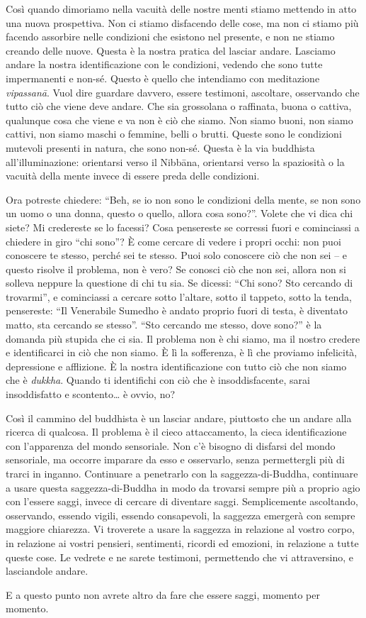 Così quando dimoriamo nella vacuità delle nostre menti stiamo mettendo
in atto una nuova prospettiva. Non ci stiamo disfacendo delle cose, ma
non ci stiamo più facendo assorbire nelle condizioni che esistono nel
presente, e non ne stiamo creando delle nuove. Questa è la nostra
pratica del lasciar andare. Lasciamo andare la nostra identificazione
con le condizioni, vedendo che sono tutte impermanenti e non-sé. Questo
è quello che intendiamo con meditazione \emph{vipassanā}. Vuol dire
guardare davvero, essere testimoni, ascoltare, osservando che tutto ciò che viene deve andare. Che sia grossolana o raffinata, buona o cattiva,
qualunque cosa che viene e va non è ciò che siamo. Non siamo buoni, non
siamo cattivi, non siamo maschi o femmine, belli o brutti. Queste sono
le condizioni mutevoli presenti in natura, che sono non-sé. Questa è la
via buddhista all'illuminazione: orientarsi verso il Nibbāna, orientarsi
verso la spaziosità o la vacuità della mente invece di essere preda
delle condizioni.

Ora potreste chiedere: ``Beh, se io non sono le condizioni della mente,
se non sono un uomo o una donna, questo o quello, allora cosa sono?''.
Volete che vi dica chi siete? Mi credereste se lo facessi? Cosa
pensereste se corressi fuori e cominciassi a chiedere in giro ``chi
sono''? È come cercare di vedere i propri occhi: non puoi conoscere te
stesso, perché sei te stesso. Puoi solo conoscere ciò che non sei -- e
questo risolve il problema, non è vero? Se conosci ciò che non sei,
allora non si solleva neppure la questione di chi tu sia. Se dicessi:
``Chi sono? Sto cercando di trovarmi'', e cominciassi a cercare sotto
l'altare, sotto il tappeto, sotto la tenda, pensereste: ``Il Venerabile
Sumedho è andato proprio fuori di testa, è diventato matto, sta cercando
se stesso''. ``Sto cercando me stesso, dove sono?'' è la domanda più
stupida che ci sia. Il problema non è chi siamo, ma il nostro credere e
identificarci in ciò che non siamo. È lì la sofferenza, è lì che
proviamo infelicità, depressione e afflizione. È la nostra
identificazione con tutto ciò che non siamo che è \emph{dukkha}. Quando
ti identifichi con ciò che è insoddisfacente, sarai insoddisfatto e
scontento\ldots{} è ovvio, no?

Così il cammino del buddhista è un lasciar andare, piuttosto che un
andare alla ricerca di qualcosa. Il problema è il cieco attaccamento, la
cieca identificazione con l'apparenza del mondo sensoriale. Non c'è
bisogno di disfarsi del mondo sensoriale, ma occorre imparare da esso e
osservarlo, senza permettergli più di trarci in inganno. Continuare a
penetrarlo con la saggezza-di-Buddha, continuare a usare questa
saggezza-di-Buddha in modo da trovarsi sempre più a proprio agio con
l'essere saggi, invece di cercare di diventare saggi. Semplicemente
ascoltando, osservando, essendo vigili, essendo consapevoli, la saggezza
emergerà con sempre maggiore chiarezza. Vi troverete a usare la saggezza
in relazione al vostro corpo, in relazione ai vostri pensieri, sentimenti, ricordi ed
emozioni, in relazione a tutte queste cose. Le vedrete e ne sarete
testimoni, permettendo che vi attraversino, e lasciandole andare.

E a questo punto non avrete altro da fare che essere saggi, momento per
momento.